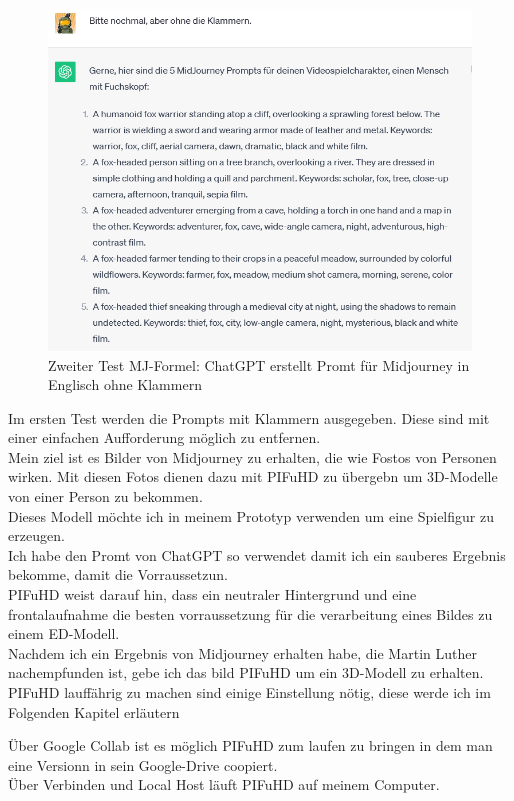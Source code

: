 \documentclass[10pt,a4paper,bibliography=totocnumbered,listof=totocnumbered]{scrartcl}
\begin{document}
\begin{figure}[h]
   		 \centering
\includegraphics[scale=0.7]{BilderFuerBA/CGPTMidJourneyMartinLuther/06.png}
   		 \caption{Zweiter Test MJ-Formel: ChatGPT erstellt Promt für Midjourney in Englisch ohne Klammern}
   		 \label{fig:chatgpt-ptompt-Midjourney-06}
\end{figure}
Im ersten Test werden die Prompts mit Klammern ausgegeben. Diese sind mit einer einfachen Aufforderung möglich zu entfernen.
\\
Mein ziel ist es Bilder von Midjourney zu erhalten, die wie Fostos von Personen wirken. Mit diesen Fotos dienen dazu mit PIFuHD zu übergebn um 3D-Modelle von einer Person zu bekommen.
\\
Dieses Modell möchte ich in meinem Prototyp verwenden um eine Spielfigur zu erzeugen.
\\
Ich habe den Promt von ChatGPT so verwendet damit ich ein sauberes Ergebnis bekomme, damit die Vorraussetzun.
\\
PIFuHD weist darauf hin, dass ein neutraler Hintergrund und eine frontalaufnahme die besten vorraussetzung für die verarbeitung eines Bildes zu einem ED-Modell.
\\
Nachdem ich ein Ergebnis von Midjourney erhalten habe, die Martin Luther nachempfunden ist, gebe ich das bild PIFuHD um ein 3D-Modell zu erhalten.
\\
PIFuHD lauffährig zu machen sind einige Einstellung nötig, diese werde ich im Folgenden Kapitel erläutern
 
Über Google Collab ist es möglich PIFuHD zum laufen zu bringen in dem man eine Versionn in sein Google-Drive coopiert.
\\
Über Verbinden und Local Host läuft PIFuHD auf meinem Computer.
\\
 
\end{document}

